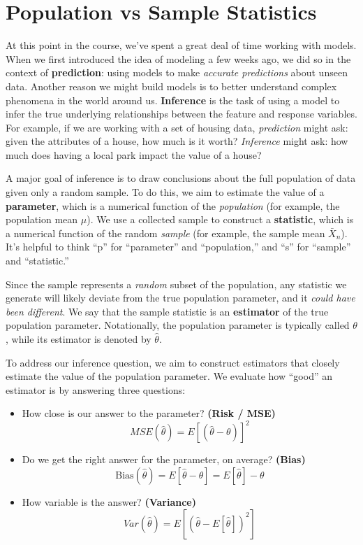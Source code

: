 \documentclass[
  letterpaper,
  DIV=11,
  numbers=noendperiod]{scrreprt}
\providecommand{\tightlist}{%
  \setlength{\itemsep}{0pt}\setlength{\parskip}{0pt}}\usepackage{longtable,booktabs,array}
\begin{document}
\section{Population vs Sample
Statistics}\label{population-vs-sample-statistics}

At this point in the course, we've spent a great deal of time working
with models. When we first introduced the idea of modeling a few weeks
ago, we did so in the context of \textbf{prediction}: using models to
make \emph{accurate predictions} about unseen data. Another reason we
might build models is to better understand complex phenomena in the
world around us. \textbf{Inference} is the task of using a model to
infer the true underlying relationships between the feature and response
variables. For example, if we are working with a set of housing data,
\emph{prediction} might ask: given the attributes of a house, how much
is it worth? \emph{Inference} might ask: how much does having a local
park impact the value of a house?

A major goal of inference is to draw conclusions about the full
population of data given only a random sample. To do this, we aim to
estimate the value of a \textbf{parameter}, which is a numerical
function of the \emph{population} (for example, the population mean
\(\mu\)). We use a collected sample to construct a \textbf{statistic},
which is a numerical function of the random \emph{sample} (for example,
the sample mean \(\bar{X}_n\)). It's helpful to think ``p'' for
``parameter'' and ``population,'' and ``s'' for ``sample'' and
``statistic.''

Since the sample represents a \emph{random} subset of the population,
any statistic we generate will likely deviate from the true population
parameter, and it \emph{could have been different}. We say that the
sample statistic is an \textbf{estimator} of the true population
parameter. Notationally, the population parameter is typically called
\(\theta\), while its estimator is denoted by \(\hat{\theta}\).

To address our inference question, we aim to construct estimators that
closely estimate the value of the population parameter. We evaluate how
``good'' an estimator is by answering three questions:

\begin{itemize}
\tightlist
\item
  How close is our answer to the parameter? \textbf{(Risk / MSE)}
  \[ MSE(\hat{\theta}) = E[(\hat{\theta} - \theta)]^2\]
\item
  Do we get the right answer for the parameter, on average?
  \textbf{(Bias)}
  \[\text{Bias}(\hat{\theta}) = E[\hat{\theta} - \theta] = E[\hat{\theta}] - \theta\]
\item
  How variable is the answer? \textbf{(Variance)}
  \[Var(\hat{\theta}) = E[(\hat{\theta} - E[\hat{\theta}])^2] \]
\end{itemize}
\end{document}

